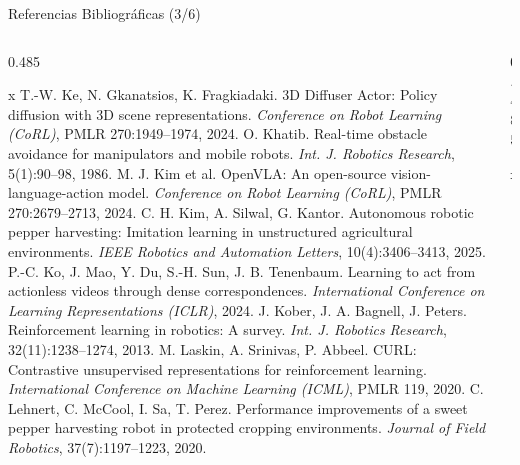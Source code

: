 \documentclass[aspectratio=169,10pt,xcolor={dvipsnames,table}]{beamer}
\begin{document}
\begin{frame}{Referencias Bibliográficas (3/6)}
  \begin{columns}[T, onlytextwidth]
    \begin{column}{0.485\textwidth}
      \RefsFont
      \begin{thebibliography}{x}\setlength{\itemsep}{0.8pt}
         T.-W. Ke, N. Gkanatsios, K. Fragkiadaki. \newblock 3D Diffuser Actor: Policy diffusion with 3D scene representations. \newblock \emph{Conference on Robot Learning (CoRL)}, PMLR 270:1949--1974, 2024.
         O. Khatib. \newblock Real-time obstacle avoidance for manipulators and mobile robots. \newblock \emph{Int. J. Robotics Research}, 5(1):90--98, 1986.
         M. J. Kim et al. \newblock OpenVLA: An open-source vision-language-action model. \newblock \emph{Conference on Robot Learning (CoRL)}, PMLR 270:2679--2713, 2024.
         C. H. Kim, A. Silwal, G. Kantor. \newblock Autonomous robotic pepper harvesting: Imitation learning in unstructured agricultural environments. \newblock \emph{IEEE Robotics and Automation Letters}, 10(4):3406--3413, 2025.
         P.-C. Ko, J. Mao, Y. Du, S.-H. Sun, J. B. Tenenbaum. \newblock Learning to act from actionless videos through dense correspondences. \newblock \emph{International Conference on Learning Representations (ICLR)}, 2024.
         J. Kober, J. A. Bagnell, J. Peters. \newblock Reinforcement learning in robotics: A survey. \newblock \emph{Int. J. Robotics Research}, 32(11):1238--1274, 2013.
         M. Laskin, A. Srinivas, P. Abbeel. \newblock CURL: Contrastive unsupervised representations for reinforcement learning. \newblock \emph{International Conference on Machine Learning (ICML)}, PMLR 119, 2020.
         C. Lehnert, C. McCool, I. Sa, T. Perez. \newblock Performance improvements of a sweet pepper harvesting robot in protected cropping environments. \newblock \emph{Journal of Field Robotics}, 37(7):1197--1223, 2020.
      \end{thebibliography}
    \end{column}
    \begin{column}{0.485\textwidth}
      \RefsFont
      \begin{thebibliography}{x}\setlength{\itemsep}{0.8pt}

\end{thebibliography}
\end{column}
\end{columns}
\end{frame}
\end{document}
